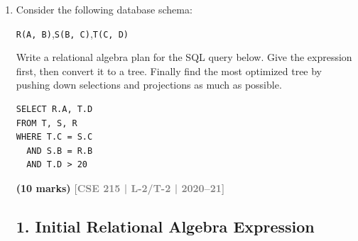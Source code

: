 \documentclass[12pt,a3paper]{article}
\newcommand{\yr}[1]{\hfill\textcolor{gray}{\small\textbf{[#1]}}}
\newcommand{\mk}[1]{\textcolor{orange!70!black}{\small\textbf{(#1 marks)}}}
\begin{document}
\begin{enumerate}
\vspace{0.2cm}
\hrule
\vspace{0.2cm}

\textbf{Equivalence Rules (The notations carry usual meaning)}
\begin{enumerate}
    \item $\sigma_{\theta}(E_1 \times E_2) = E_1 \bowtie_{\theta} E_2$
    \item $\sigma_{\theta_0}(E_1 \bowtie_{\theta} E_2) \equiv (\sigma_{\theta_0}(E_1)) \bowtie_{\theta} E_2$
    \item $\sigma_{\theta_1 \wedge \theta_2}(E_1 \bowtie_{\theta} E_2) = (\sigma_{\theta_1}(E_1)) \bowtie_{\theta} (\sigma_{\theta_2}(E_2))$
    \item $\Pi_{L_1 \cup L_2}(E_1 \bowtie_{\theta} E_2) = \Pi_{L_1}(E_1) \bowtie_{\theta} \Pi_{L_2}(E_2)$
    \item $\Pi_{L_1 \cup L_2}(E_1 \bowtie_{\theta} E_2) = \Pi_{L_1 \cup L_2}(\Pi_{L_1 \cup L_3}(E_1) \bowtie_{\theta} \Pi_{L_2 \cup L_4}(E_2))$
\end{enumerate}
\vspace{0.1cm}

\mk{15} \yr{CSE 215 | L-2/T-2 | 2021--22}

\item Consider the following database schema:
\begin{center}
\texttt{R(A, B)},\quad \texttt{S(B, C)},\quad \texttt{T(C, D)}
\end{center}
Write a relational algebra plan for the SQL query below. Give the expression first, then convert it to a tree. Finally find the most optimized tree by pushing down selections and projections as much as possible.
\begin{lstlisting}
SELECT R.A, T.D
FROM T, S, R
WHERE T.C = S.C
  AND S.B = R.B
  AND T.D > 20
\end{lstlisting}
 \mk{10} \yr{CSE 215 | L-2/T-2 | 2020--21}

 \begin{tcolorbox}[enhanced,breakable,ansbox,colback=cD!4,colframe=cD,boxrule=0.8pt,arc=5pt,title={\textbf{Answer}},fonttitle=\bfseries\color{white},colbacktitle=cD]

\subsection*{1. Initial Relational Algebra Expression}


\end{tcolorbox}
\end{enumerate}
\end{document}
